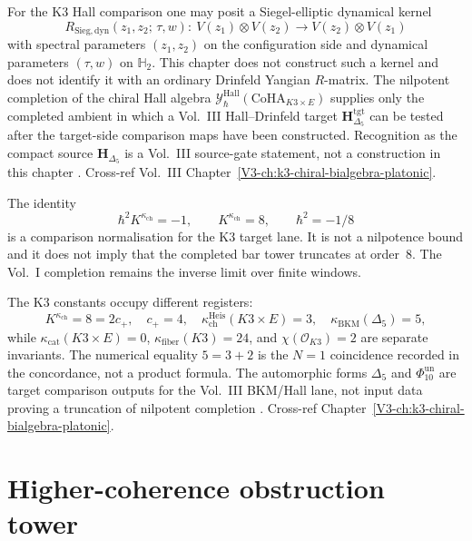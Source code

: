 \begin{remark}
\label{rem:nc-1}
For the K3 Hall comparison one may posit a Siegel-elliptic dynamical
kernel
\[
 R_{\mathrm{Sieg,dyn}}(z_1, z_2;\,\tau, w):\
 V(z_1)\otimes V(z_2) \to V(z_2)\otimes V(z_1)
\]
with spectral parameters $(z_1,z_2)$ on the configuration side and
dynamical parameters $(\tau,w)$ on $\mathbb H_2$.  This chapter does
not construct such a kernel and does not identify it with an ordinary
Drinfeld Yangian $R$-matrix.  The nilpotent completion of the chiral
Hall algebra
$\mathcal Y^{\mathrm{Hall}}_\hbar(\mathrm{CoHA}_{K3\times E})$
supplies only the completed ambient in which a Vol.~III
Hall--Drinfeld target $\mathbf H_{\Delta_5}^{\mathrm{tgt}}$ can be
tested after the target-side comparison maps have been constructed.
Recognition as the compact source $\mathbf H_{\Delta_5}$ is a
Vol.~III source-gate statement, not a construction in this chapter
\cite{PasolZagier2013,SchiffmannVasserot2012,Davison2017}. Cross-ref
Vol.~III Chapter~\ref{V3-ch:k3-chiral-bialgebra-platonic}.
\end{remark}

\begin{remark}
\label{rem:nc-2}
The identity
\[
\hbar^2 K^{\kappa_{\mathrm{ch}}}=-1,\qquad
K^{\kappa_{\mathrm{ch}}}=8,\qquad
\hbar^2=-1/8
\]
is a comparison normalisation for the K3 target lane.  It is not a
nilpotence bound and it does not imply that the completed bar tower
truncates at order~$8$.  The Vol.~I completion remains the inverse
limit over finite windows.

The K3 constants occupy different registers:
\[
K^{\kappa_{\mathrm{ch}}}=8=2c_+,\quad c_+=4,\quad
\kappa_{\mathrm{ch}}^{\mathrm{Heis}}(K3\times E)=3,\quad
\kappa_{\mathrm{BKM}}(\Delta_5)=5,
\]
while $\kappa_{\mathrm{cat}}(K3\times E)=0$,
$\kappa_{\mathrm{fiber}}(K3)=24$, and $\chi(\mathcal O_{K3})=2$ are
separate invariants.  The numerical equality $5=3+2$ is the
$N=1$ coincidence recorded in the concordance, not a product formula.
The automorphic forms $\Delta_5$ and $\Phi_{10}^{\mathrm{un}}$ are
target comparison outputs for the Vol.~III BKM/Hall lane, not input
data proving a truncation of nilpotent completion
\cite{Lusztig1990,GritsenkoNikulin1998}. Cross-ref
Chapter~\ref{V3-ch:k3-chiral-bialgebra-platonic}.
\end{remark}

\section{Higher-coherence obstruction tower}
\label{sec:nc-supplement-ii}


